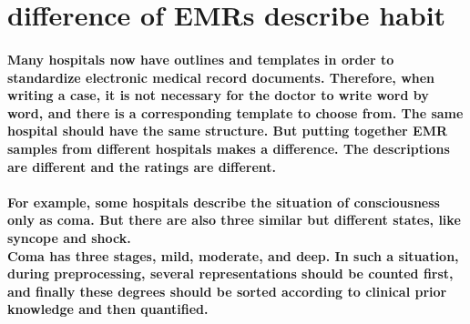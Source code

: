 \documentclass{article}
\begin{document}
\date{}
\maketitle
\section{difference of EMRs describe habit}

\paragraph{Many hospitals now have outlines and templates in order to standardize electronic medical record documents. Therefore, when writing a case, it is not necessary for the doctor to write word by word, and there is a corresponding template to choose from. The same hospital should have the same structure. But putting together EMR samples from different hospitals makes a difference. The descriptions are different and the ratings are different.\\
\\For example, some hospitals describe the situation of consciousness only as coma. But there are also three similar but different states, like syncope and shock.
\\Coma has three stages, mild, moderate, and deep.
In such a situation, during preprocessing, several representations should be counted first, and finally these degrees should be sorted according to clinical prior knowledge and then quantified.}
\end{document}
